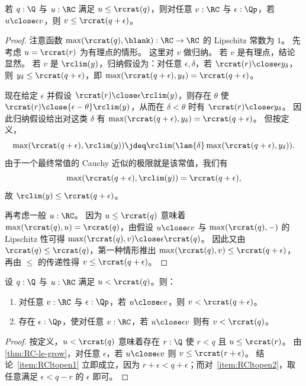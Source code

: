 \begin{lem}\label{thm:RC-le-grow}
  若 $q:\Q$ 与 $u:\RC$ 满足 $u\le \rcrat(q)$，则对任意 $v:\RC$ 与 $\epsilon:\Qp$，若 $u\close\epsilon v$，则 $v\le \rcrat(q+\epsilon)$。
\end{lem}
\begin{proof}
  注意函数 $\max(\rcrat(q),\blank):\RC\to\RC$ 的 Lipschitz 常数为 $1$。
  先考虑 $u=\rcrat(r)$ 为有理点的情形。
  这里对 $v$ 做归纳。
  若 $v$ 是有理点，结论显然。
  若 $v$ 是 $\rclim(y)$，归纳假设为：对任意 $\epsilon,\delta$，若 $\rcrat(r)\close\epsilon y_\delta$，则 $y_\delta \le \rcrat(q+\epsilon)$，即 $\max(\rcrat(q+\epsilon),y_\delta)=\rcrat(q+\epsilon)$。

  现在给定 $\epsilon$ 并假设 $\rcrat(r)\close\epsilon \rclim(y)$，则存在 $\theta$ 使 $\rcrat(r)\close{\epsilon-\theta} \rclim(y)$，从而在 $\delta<\theta$ 时有 $\rcrat(r)\close\epsilon y_\delta$。
  因此归纳假设给出对这类 $\delta$ 有 $\max(\rcrat(q+\epsilon),y_\delta)=\rcrat(q+\epsilon)$。
  但按定义，
  \[\max(\rcrat(q+\epsilon),\rclim(y)) \jdeq \rclim(\lam{\delta} \max(\rcrat(q+\epsilon),y_\delta)).\]
  由于一个最终常值的 Cauchy 近似的极限就是该常值，我们有
  \[\max(\rcrat(q+\epsilon),\rclim(y)) = \rcrat(q+\epsilon),\] 故 $\rclim(y)\le \rcrat(q+\epsilon)$。

  再考虑一般 $u:\RC$。
  因为 $u\le \rcrat(q)$ 意味着 $\max(\rcrat(q),u)=\rcrat(q)$，由假设 $u\close\epsilon v$ 与 $\max(\rcrat(q),-)$ 的 Lipschitz 性可得 $\max(\rcrat(q),v) \close\epsilon \rcrat(q)$。
  因此又由 $\rcrat(q)\le \rcrat(q)$，第一种情形推出 $\max(\rcrat(q),v) \le \rcrat(q+\epsilon)$，再由 $\le$ 的传递性得 $v\le \rcrat(q+\epsilon)$。
\end{proof}

\begin{lem}\label{thm:RC-lt-open}
  设 $q:\Q$ 与 $u:\RC$ 满足 $u<\rcrat(q)$。则：
  \begin{enumerate}
  \item 对任意 $v:\RC$ 与 $\epsilon:\Qp$，若 $u\close\epsilon v$，则 $v< \rcrat(q+\epsilon)$。\label{item:RCltopen1}
  \item 存在 $\epsilon:\Qp$，使对任意 $v:\RC$，若 $u\close\epsilon v$ 则有 $v<\rcrat(q)$。\label{item:RCltopen2}
  \end{enumerate}
\end{lem}
\begin{proof}
  按定义，$u<\rcrat(q)$ 意味着存在 $r:\Q$ 使 $r<q$ 且 $u\le \rcrat(r)$。
  由 \cref{thm:RC-le-grow}，对任意 $\epsilon$，若 $u\close\epsilon v$ 则 $v\le \rcrat(r+\epsilon)$。
  结论~\ref{item:RCltopen1} 立即成立，因为 $r+\epsilon<q+\epsilon$；而对~\ref{item:RCltopen2}，取任意满足 $\epsilon <q-r$ 的 $\epsilon$ 即可。
\end{proof}

